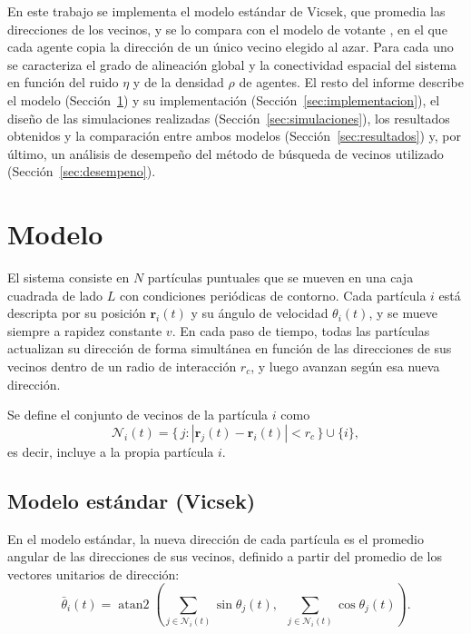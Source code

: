 \documentclass[11pt,a4paper]{article}
\newcommand{\rmed}{\mathbf{r}}
\begin{document}
En este trabajo se implementa el modelo estándar de Vicsek, que promedia
las direcciones de los vecinos, y se lo compara con el modelo de votante
\cite{loscar2021}, en el que cada agente copia la dirección de un único
vecino elegido al azar. Para cada uno se caracteriza el grado de alineación
global y la conectividad espacial del sistema en función del ruido $\eta$ y
de la densidad $\rho$ de agentes. El resto del informe describe el modelo
(Sección~\ref{sec:modelo})
y su implementación (Sección~\ref{sec:implementacion}), el diseño de las
simulaciones realizadas (Sección~\ref{sec:simulaciones}), los resultados
obtenidos y la comparación entre ambos modelos
(Sección~\ref{sec:resultados}) y, por último, un análisis de desempeño del
método de búsqueda de vecinos utilizado (Sección~\ref{sec:desempeno}).

\section{Modelo}
\label{sec:modelo}

El sistema consiste en $N$ partículas puntuales que se mueven en una caja
cuadrada de lado $L$ con condiciones periódicas de contorno. Cada partícula
$i$ está descripta por su posición $\rmed_i(t)$ y su ángulo de velocidad
$\theta_i(t)$, y se mueve siempre a rapidez constante $v$. En cada paso de
tiempo, todas las partículas actualizan su dirección de forma simultánea en
función de las direcciones de sus vecinos dentro de un radio de interacción
$r_c$, y luego avanzan según esa nueva dirección.

Se define el conjunto de vecinos de la partícula $i$ como
\begin{equation}
  \mathcal{N}_i(t) = \{\, j : |\rmed_j(t) - \rmed_i(t)| < r_c \,\} \cup \{i\},
  \label{eq:vecinos}
\end{equation}
es decir, incluye a la propia partícula $i$.

\subsection{Modelo estándar (Vicsek)}

En el modelo estándar, la nueva dirección de cada partícula es el promedio
angular de las direcciones de sus vecinos, definido a partir del promedio
de los vectores unitarios de dirección:
\begin{equation}
  \bar\theta_i(t) = \operatorname{atan2}\!\left(
    \sum_{j \in \mathcal{N}_i(t)} \sin\theta_j(t), \;\;
    \sum_{j \in \mathcal{N}_i(t)} \cos\theta_j(t)
  \right).
  \label{eq:vicsek}
\end{equation}
\end{document}
